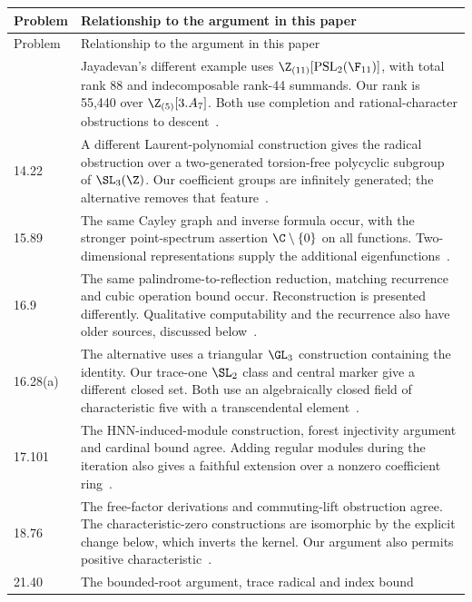 \small
\begin{longtable}{@{}p{}>{\raggedright\arraybackslash}p{}@{}}
\toprule
Problem & Relationship to the argument in this paper\\\midrule
\endfirsthead
\toprule Problem & Relationship to the argument in this paper\\\midrule
\endhead
\bottomrule\endfoot
4.55 & Jayadevan's different example uses \(\Z_{(11)}[\operatorname{PSL}_2(\F_{11})]\),
with total rank 88 and indecomposable rank-44 summands. Our rank is
55,440 over \(\Z_{(5)}[3.A_7]\). Both use completion and rational-character
obstructions to descent~\cite{jayadevan-4-55}.\\[5pt]
14.22 & A different Laurent-polynomial construction gives the radical
obstruction over a two-generated torsion-free polycyclic subgroup of
\(\SL_3(\Z)\). Our coefficient groups are infinitely generated;
the alternative removes that feature~\cite{jayadevan-14-22}.\\[5pt]
15.89 & The same Cayley graph and inverse formula occur, with the stronger
point-spectrum assertion \(\C\setminus\{0\}\) on all functions.
Two-dimensional representations supply the additional eigenfunctions~\cite{jayadevan-15-89}.\\[5pt]
16.9 & The same palindrome-to-reflection reduction, matching recurrence
and cubic operation bound occur. Reconstruction is presented differently.
Qualitative computability and the recurrence also have older sources,
discussed below~\cite{jayadevan-16-9}.\\[5pt]
16.28(a) & The alternative uses a triangular \(\GL_3\) construction
containing the identity. Our trace-one \(\SL_2\) class and central
marker give a different closed set. Both use an algebraically closed
field of characteristic five with a transcendental element~\cite{jayadevan-16-28}.\\[5pt]
17.101 & The HNN-induced-module construction, forest injectivity argument
and cardinal bound agree. Adding regular modules during the iteration
also gives a faithful extension over a nonzero coefficient ring~\cite{jayadevan-17-101}.\\[5pt]
18.76 & The free-factor derivations and commuting-lift obstruction agree.
The characteristic-zero constructions are isomorphic by the explicit
change below, which inverts the kernel. Our argument also permits
positive characteristic~\cite{jayadevan-18-76}.\\[5pt]
21.40 & The bounded-root argument, trace radical and index bound

\end{longtable}
